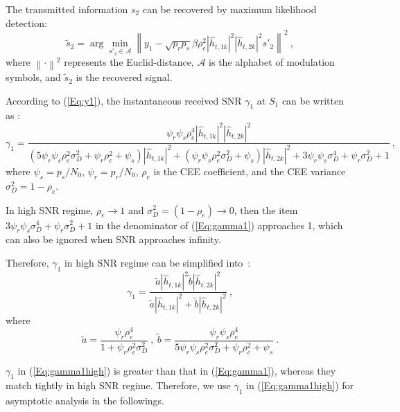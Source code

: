 \documentclass[onecolumn,letterpaper,11pt,draftclsnofoot]{IEEEtran}
\begin{document}
The transmitted information $s_2$ can be recovered by maximum
likelihood detection:
\begin{equation}
\tilde s_2  = \arg \mathop {\min }\limits_{ {s'_2  \in \mathcal{A}}
} \left\| {y_1  - \sqrt {p_r p_s } \beta \rho _e^2 \left| {\hat
h_{t,1k} } \right|^2 \left| {\hat h_{t,2k} } \right|^2 s'_2 }
\right\|^2 ~,
\end{equation}
where $ \left\| {\cdot} \right\|^2 $ represents the Euclid-distance,
$ {\mathcal{A}} $ is the alphabet of modulation symbols, and $\tilde
s_2$ is the recovered signal.

According to (\ref{Eq:y1}), the instantaneous received SNR
$\gamma_1$ at $S_1$ can be written as :
\begin{equation}\label{Eq:gamma1}
\gamma _1  = \frac{{\psi _r \psi _s \rho _e^4 \left| {\hat h_{t,1k}
} \right|^2 \left| {\hat h_{t,2k} } \right|^2 }}{{\left(5\psi _r
\psi _s \rho _e^2 \sigma _D^2  + \psi _r \rho _e^2  + \psi _s
\right)\left| {\hat h_{t,1k} } \right|^2  + \left(\psi _r \psi _s
\rho _e^2 \sigma _D^2 + \psi _s \right)\left| {\hat h_{t,2k} }
\right|^2 + 3\psi _r \psi _s \sigma _D^4  + \psi _r \sigma _D^2  +
1}}~,
\end{equation}
where $ \psi _s = p_s / N_0 $, $ \psi _r = p_r / N_0 $, $\rho_e$ is
the CEE coefficient, and the CEE variance $\sigma_D^2=1-\rho_e$.

In high SNR regime, $\rho_e \to 1$ and
$\sigma_D^2=\left(1-\rho_e\right) \to 0$, then the item $3\psi _r
\psi _s \sigma _D^4 + \psi _r \sigma _D^2 + 1$ in the denominator of
(\ref{Eq:gamma1}) approaches 1, which can also be ignored when SNR
approaches infinity\cite{Song2011}.

Therefore, $\gamma_1$ in high SNR regime can be simplified into~:
\begin{equation}\label{Eq:gamma1high}
\gamma _1  = \frac{{\tilde a \left| {\hat h_{t,1k} } \right|^2
\tilde b \left| {\hat h_{t,2k} } \right|^2 }}{{\tilde a \left| {\hat
h_{t,1k} } \right|^2 + \tilde b \left| {\hat h_{t,2k} } \right|^2
}}~,
\end{equation}
 where
\begin{equation}
\tilde a  = \frac{{\psi_r  \rho _e^4 }}{{1 + \psi_r
 \rho _e^2 \sigma _D^2 }}~,~
\tilde b  = \frac{{\psi_r \psi_s \rho _e^4  }}{{5\psi_r \psi_s \rho
_e^2 \sigma _D^2  + \psi_r \rho _e^2   + \psi_s  }}~.
\end{equation}

$\gamma_1$ in (\ref{Eq:gamma1high}) is greater than that in
(\ref{Eq:gamma1}), whereas they match tightly in high SNR regime.
Therefore, we use $\gamma_1$ in (\ref{Eq:gamma1high}) for asymptotic
analysis in the followings.
\end{document}
